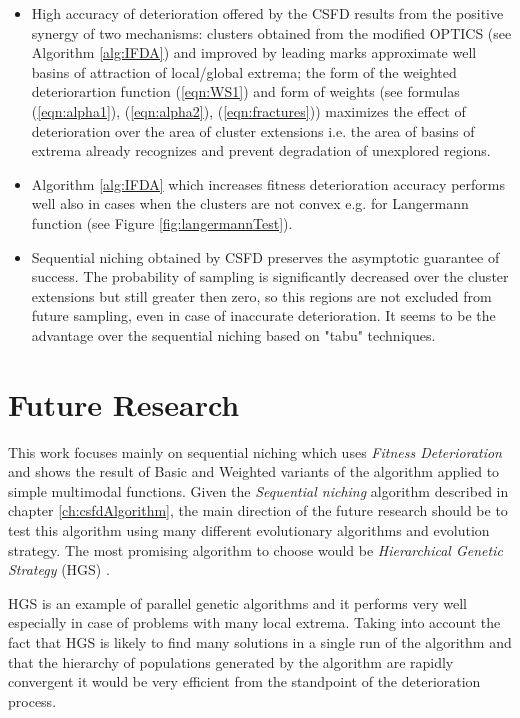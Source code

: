 \begin{itemize}
\item
High accuracy of deterioration offered by the CSFD results from
the positive synergy of two mechanisms:
clusters obtained from the modified OPTICS (see Algorithm \ref{alg:IFDA})
and improved by leading marks
approximate well basins of attraction of local/global extrema;
the form of the weighted deteriorartion function (\ref{eqn:WS1})
and form of weights (see formulas (\ref{eqn:alpha1}), (\ref{eqn:alpha2}), 
(\ref{eqn:fractures})) maximizes the effect of deterioration over the area of
cluster extensions i.e. the area of basins of extrema already recognizes
and prevent degradation of unexplored regions.



\item
Algorithm \ref{alg:IFDA} which increases 
fitness deterioration accuracy performs well also in cases when 
the clusters are not convex e.g. for Langermann function
(see Figure \ref{fig:langermannTest}).


\item
Sequential niching obtained by CSFD preserves 
the asymptotic guarantee of success.
The probability of sampling is significantly
decreased over the cluster extensions but still greater then zero, 
so this regions are not excluded from future sampling, even in case
of inaccurate deterioration.
It seems to be the advantage over the sequential niching 
based on "tabu" techniques.

\end{itemize}


\section{Future Research}

This work focuses mainly on sequential niching which uses \textit{Fitness
Deterioration} and shows the result of Basic and Weighted variants of the algorithm applied to
simple multimodal functions. Given the \textit{Sequential
niching} algorithm described in chapter \ref{ch:csfdAlgorithm}, the main
direction of the future research should be to test this algorithm using many 
different evolutionary algorithms and evolution strategy.
The most promising algorithm to choose would be \textit{Hierarchical Genetic
Strategy} (HGS) \cite{WierzbaSemczukKolodziejSchaefer2003}.

HGS is an example of parallel
genetic algorithms and it performs very well especially in case of problems with many local extrema.
Taking into account the fact that HGS is likely to find many solutions in a
single run of the algorithm and that the hierarchy of populations generated
by the algorithm are rapidly convergent it would be very efficient 
from the standpoint of the deterioration process.

